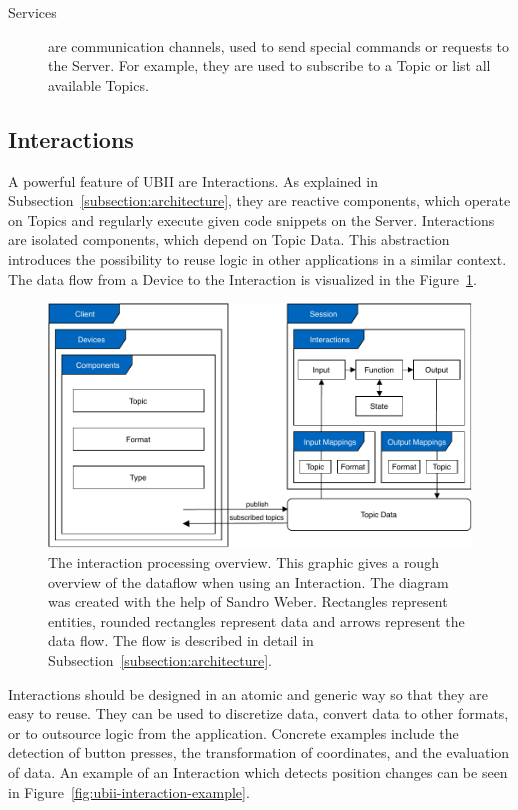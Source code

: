\begin{description}
	\item[Services] are communication channels, used to send special commands or requests to the Server. For example, they are used to subscribe to a Topic or list all available Topics.
\end{description}


\subsection{Interactions}\label{subsection:interactions}
A powerful feature of \gls{UBII} are Interactions. As explained in Subsection~\ref{subsection:architecture}, they are reactive components, which operate on Topics and regularly execute given code snippets on the Server. Interactions are isolated components, which depend on Topic Data. This abstraction introduces the possibility to reuse logic in other applications in a similar context. The data flow from a Device to the Interaction is visualized in the Figure~\ref{fig:ubii-cd}.

\begin{figure}[H]
	\centering
	\includegraphics[width=12cm]{figures/implementation/ubii_cd.pdf}
	\caption[UBII communication diagram]{The interaction processing overview. This graphic gives a rough overview of the dataflow when using an Interaction. The diagram was created with the help of Sandro Weber. Rectangles represent entities, rounded rectangles represent data and arrows represent the data flow. The flow is described in detail in Subsection~\ref{subsection:architecture}.}\label{fig:ubii-cd}
\end{figure}

Interactions should be designed in an atomic and generic way so that they are easy to reuse. They can be used to discretize data, convert data to other formats, or to outsource logic from the application. Concrete examples include the detection of button presses, the transformation of coordinates, and the evaluation of data. An example of an Interaction which detects position changes can be seen in Figure~\ref{fig:ubii-interaction-example}.

